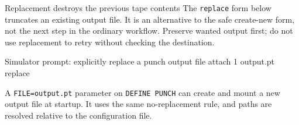 \begin{operationnote}{Replacement destroys the previous tape contents}
The \passthrough{\lstinline!replace!} form below truncates an existing output file. It is an alternative to the safe create-new form, not the next step in the ordinary workflow. Preserve wanted output first; do not use replacement to retry without checking the destination.
\end{operationnote}

\begin{commandexample}{Simulator prompt: explicitly replace a punch output file}
attach 1 output.pt replace
\end{commandexample}

A \passthrough{\lstinline!FILE=output.pt!} parameter on \passthrough{\lstinline!DEFINE PUNCH!} can create and mount a new output file at startup. It uses the same no-replacement rule, and paths are resolved relative to the configuration file.
